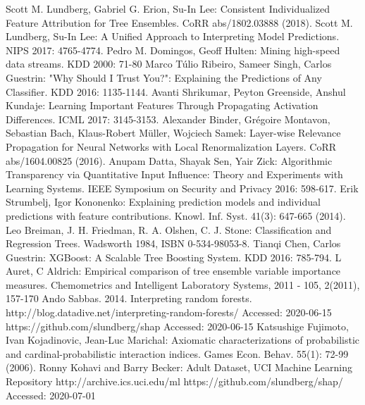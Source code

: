 \documentclass[conference]{IEEEtran}
\begin{document}
\begin{thebibliography}{00}
 Scott M. Lundberg, Gabriel G. Erion, Su-In Lee:
Consistent Individualized Feature Attribution for Tree Ensembles. CoRR abs/1802.03888 (2018).
 Scott M. Lundberg, Su-In Lee: A Unified Approach to Interpreting Model Predictions. NIPS 2017: 4765-4774.
 Pedro M. Domingos, Geoff Hulten: Mining high-speed data streams. KDD 2000: 71-80
 Marco Túlio Ribeiro, Sameer Singh, Carlos Guestrin: "Why Should I Trust You?": Explaining the Predictions of Any Classifier. KDD 2016: 1135-1144.
 Avanti Shrikumar, Peyton Greenside, Anshul Kundaje: Learning Important Features Through Propagating Activation Differences. ICML 2017: 3145-3153.
 Alexander Binder, Grégoire Montavon, Sebastian Bach, Klaus-Robert Müller, Wojciech Samek: Layer-wise Relevance Propagation for Neural Networks with Local Renormalization Layers. CoRR abs/1604.00825 (2016).
Anupam Datta, Shayak Sen, Yair Zick: Algorithmic Transparency via Quantitative Input Influence: Theory and Experiments with Learning Systems. IEEE Symposium on Security and Privacy 2016: 598-617.
Erik Strumbelj, Igor Kononenko: Explaining prediction models and individual predictions with feature contributions. Knowl. Inf. Syst. 41(3): 647-665 (2014).
 Leo Breiman, J. H. Friedman, R. A. Olshen, C. J. Stone: Classification and Regression Trees. Wadsworth 1984, ISBN 0-534-98053-8.
Tianqi Chen, Carlos Guestrin: XGBoost: A Scalable Tree Boosting System. KDD 2016: 785-794.
L Auret, C Aldrich: Empirical comparison of tree ensemble variable importance measures. Chemometrics and Intelligent Laboratory Systems, 2011 - 105, 2(2011), 157-170
Ando Sabbas. 2014. Interpreting random forests. http://blog.datadive.net/interpreting-random-forests/ Accessed: 2020-06-15
https://github.com/slundberg/shap Accessed: 2020-06-15
Katsushige Fujimoto, Ivan Kojadinovic, Jean-Luc Marichal: Axiomatic characterizations of probabilistic and cardinal-probabilistic interaction indices. Games Econ. Behav. 55(1): 72-99 (2006).
Ronny Kohavi and Barry Becker: Adult Dataset, UCI Machine Learning Repository http://archive.ics.uci.edu/ml
 https://github.com/slundberg/shap/ Accessed: 2020-07-01

\end{thebibliography}
\end{document}
